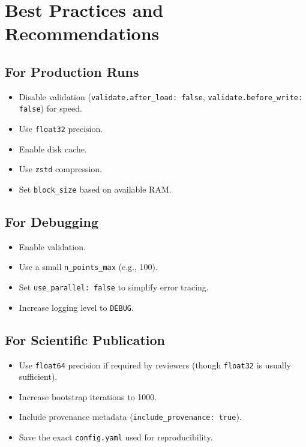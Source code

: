 \documentclass[12pt,a4paper]{article}
\begin{document}
\section{Best Practices and Recommendations}

\subsection{For Production Runs}
\begin{itemize}
    \item Disable validation (\texttt{validate.after\_load: false}, \texttt{validate.before\_write: false}) for speed.
    \item Use \texttt{float32} precision.
    \item Enable disk cache.
    \item Use \texttt{zstd} compression.
    \item Set \texttt{block\_size} based on available RAM.
\end{itemize}

\subsection{For Debugging}
\begin{itemize}
    \item Enable validation.
    \item Use a small \texttt{n\_points\_max} (e.g., 100).
    \item Set \texttt{use\_parallel: false} to simplify error tracing.
    \item Increase logging level to \texttt{DEBUG}.
\end{itemize}

\subsection{For Scientific Publication}
\begin{itemize}
    \item Use \texttt{float64} precision if required by reviewers (though \texttt{float32} is usually sufficient).
    \item Increase bootstrap iterations to 1000.
    \item Include provenance metadata (\texttt{include\_provenance: true}).
    \item Save the exact \texttt{config.yaml} used for reproducibility.
\end{itemize}
\end{document}
